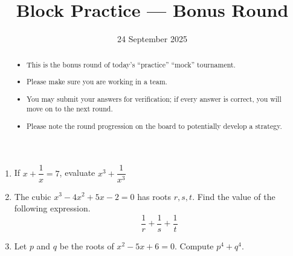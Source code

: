 \documentclass{tufte-handout}
\title{Block Practice — Bonus Round}
\author[IA Math Team]{}
\date{24 September 2025}
\begin{document}
\maketitle

\begin{abstract}
\begin{itemize}
\item This is the bonus round of today's ``practice'' ``mock'' tournament.
\item Please make sure you are working in a team.
\item You may submit your answers for verification; if every answer is correct, you will move on to the next round.
\item Please note the round progression on the board to potentially develop a strategy.
\end{itemize}
\end{abstract}

\vspace{5em}

\begin{enumerate}
    \setlength{\itemsep}{10em}
    \item If $x+\dfrac1x=7$, evaluate $x^3+\dfrac1{x^3}$
    \item The cubic \(x^3-4x^2+5x-2=0\) has roots \(r,s,t\). Find the value of the following expression.
    \[
      \frac{1}{r}+\frac{1}{s}+\frac{1}{t}
    \]
    \item Let \(p\) and \(q\) be the roots of \(x^2-5x+6=0\). Compute \(p^4+q^4\).
\end{enumerate}
\end{document}
